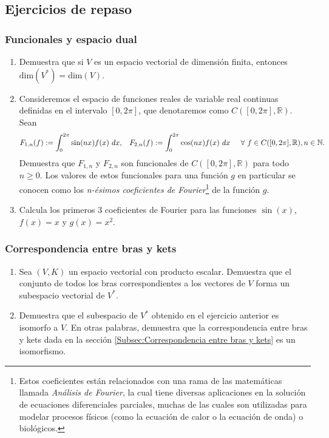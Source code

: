 \documentclass[12pt,dvipsnames]{article}
\begin{document}
\subsection{Ejercicios de repaso} \label{}

\subsubsection{Funcionales y espacio dual} \label{Ejer:Funcionales_y_espacio_dual}
\begin{enumerate}
    \item Demuestra que si $V$ es un espacio vectorial de dimensión finita, entonces $\text{dim}(V^*)=\text{dim}(V)$.
    \item Consideremos el espacio de funciones reales de variable real continuas definidas en el intervalo $[0,2\pi]$, que denotaremos como $C([0,2\pi],\mathbb{R})$. Sean \[
            F_{1,n}(f):=\int_0^{2\pi} \sin(nx)f(x) \ dx, \hspace{3mm} F_{2,n}(f):=\int_0^{2\pi} \cos(nx)f(x) \ dx \hspace{5mm} \forall \ f\in C([0,2\pi],\mathbb{R}), n\in\mathbb{N}.
        \] Demuestra que $F_{1,n}$ y $F_{2,n}$ son funcionales de $C([0,2\pi],\mathbb{R})$ para todo $n\ge 0$. Los valores de estos funcionales para una función $g$ en particular se conocen como los \emph{n-ésimos coeficientes de Fourier}\footnote{Estos coeficientes están relacionados con una rama de las matemáticas llamada \emph{Análisis de Fourier}, la cual tiene diversas aplicaciones en la solución de ecuaciones diferenciales parciales, muchas de las cuales son utilizadas para modelar procesos físicos (como la ecuación de calor o la ecuación de onda) o biológicos.} de la función $g$.
    \item Calcula los primeros 3 coeficientes de Fourier para las funciones $\sin(x)$, $f(x)=x$ y $g(x)=x^2$.
\end{enumerate}

\subsubsection{Correspondencia entre bras y kets} \label{Ejer:Correspondencia_entre_bras_y_kets}
\begin{enumerate}
    \item Sea $(V,K)$ un espacio vectorial con producto escalar. Demuestra que el conjunto de todos los bras correspondientes a los vectores de $V$ forma un subespacio vectorial de $V^*$.
    \item Demuestra que el subespacio de $V^*$ obtenido en el ejercicio anterior es isomorfo a $V$. En otras palabras, demuestra que la correspondencia entre bras y kets dada en la sección \ref{Subsec:Correspondencia entre bras y kets} es un isomorfismo.
\end{enumerate}
\end{document}

